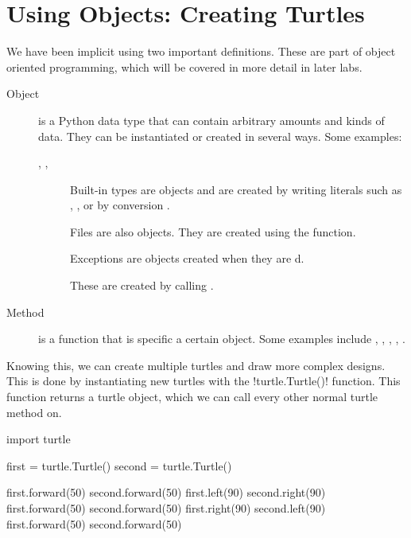 \documentclass[11pt]{cselabheader}
\begin{document}
\section{Using Objects: Creating Turtles}
We have been implicit using two important definitions. These are part of object
oriented programming, which will be covered in more detail in later labs.
\begin{description}
  \item[Object] is a Python data type that can contain arbitrary amounts and
  kinds of data. They can be instantiated or created in several ways. Some
  examples:

  \begin{description}
    \item[, , ] Built-in
    types are objects and are created by writing literals such as
    , , \pythoninline{[1,2,3]} or by
    conversion .
    \item[] Files are also objects. They are created using
    the  function.
    \item[] Exceptions are objects created when they
    are d.
    \item[] These are created by calling
    .
  \end{description}
  \item[Method] is a function that is specific a certain object. Some examples
  include , ,
  , ,
  .
\end{description}

Knowing this, we can create multiple turtles and draw more complex designs.
This is done by instantiating new turtles with the
\pythoninline!turtle.Turtle()! function. This function returns a turtle
object, which we can call every other normal turtle method on.

\begin{python3code}
import turtle

first = turtle.Turtle()
second = turtle.Turtle()

first.forward(50)
second.forward(50)
first.left(90)
second.right(90)
first.forward(50)
second.forward(50)
first.right(90)
second.left(90)
first.forward(50)
second.forward(50)
\end{python3code}
\end{document}
